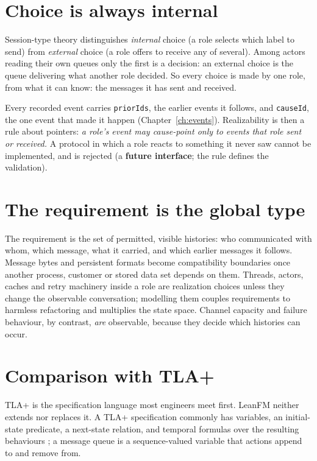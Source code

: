 \section{Choice is always internal}

Session-type theory distinguishes \emph{internal} choice (a role selects which
label to send) from \emph{external} choice (a role offers to receive any of
several). Among actors reading their own queues only the first is a decision: an
external choice is the queue delivering what another role decided. So every
choice is made by one role, from what it can know: the messages it has sent and
received.

Every recorded event carries \texttt{priorIds}, the earlier events it follows,
and \texttt{causeId}, the one event that made it happen (Chapter~\ref{ch:events}).
Realizability is then a rule about pointers: \emph{a role's event may
cause-point only to events that role sent or received.} A protocol in which a
role reacts to something it never saw cannot be implemented, and is rejected (a
\textbf{future interface}; the rule defines the validation).

\section{The requirement is the global type}

The requirement is the set of permitted, visible histories: who communicated with
whom, which message, what it carried, and which earlier messages it follows.
Message bytes and persistent formats become compatibility boundaries once another
process, customer or stored data set depends on them. Threads, actors, caches and
retry machinery inside a role are realization choices unless they change the
observable conversation; modelling them couples requirements to harmless
refactoring and multiplies the state space. Channel capacity and failure
behaviour, by contrast, \emph{are} observable, because they decide which
histories can occur.

\section{Comparison with TLA+}

TLA+ is the specification language most engineers meet first. LeanFM neither
extends nor replaces it. A TLA+ specification commonly has variables, an
initial-state predicate, a next-state relation, and temporal formulas over the
resulting behaviours \citep{lamport2002specifying}; a message queue is a
sequence-valued variable that actions append to and remove from.

